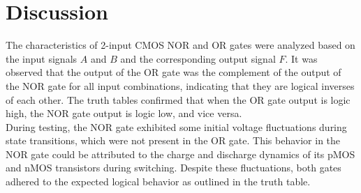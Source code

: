 \documentclass[a4paper,12pt]{article}
\begin{document}
	\section{Discussion}
	The characteristics of 2-input CMOS NOR and OR gates were analyzed based on the input signals \(A\) and \(B\) and the corresponding output signal \(F\). It was observed that the output of the OR gate was the complement of the output of the NOR gate for all input combinations, indicating that they are logical inverses of each other. The truth tables confirmed that when the OR gate output is logic high, the NOR gate output is logic low, and vice versa.\\
	
	During testing, the NOR gate exhibited some initial voltage fluctuations during state transitions, which were not present in the OR gate. This behavior in the NOR gate could be attributed to the charge and discharge dynamics of its pMOS and nMOS transistors during switching. Despite these fluctuations, both gates adhered to the expected logical behavior as outlined in the truth table.
	
	
	
\end{document}
